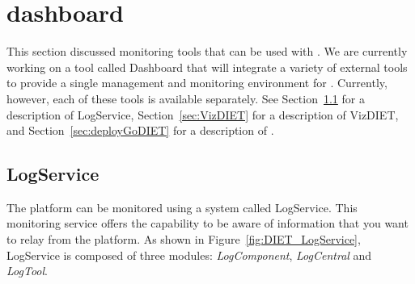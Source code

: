
\chapter{\diet dashboard}
\label{ch:dashboard}

This section discussed monitoring tools that can be used with \diet.  We are
currently working on a tool called \diet Dashboard that will integrate a
variety of external tools to provide a single management and monitoring
environment for \diet. Currently, however, each of these tools is available
separately. See Section~\ref{sec:LogService} for a description of LogService,
Section~\ref{sec:VizDIET} for a description of VizDIET, and
Section~\ref{sec:deployGoDIET} for a description of \godiet.

\section{LogService}
\label{sec:LogService}

The \diet platform can be monitored using a system called LogService. 
This monitoring service offers the capability to be aware of information that
you want to relay from the platform.  As shown in
Figure~\ref{fig:DIET_LogService}, LogService is composed of three modules:
\textit{LogComponent}, \textit{LogCentral} and \textit{LogTool}.

